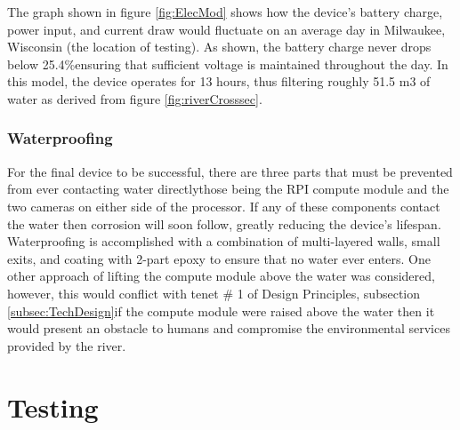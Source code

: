 \documentclass[fleqn,10pt]{SelfArx} %
\begin{document}
	The graph shown in figure \ref{fig:ElecMod} shows how the device’s battery charge, power input, and current draw would fluctuate on an average day in Milwaukee, Wisconsin (the location of testing). As shown, the battery charge never drops below 25.4\%\textemdash ensuring that sufficient voltage is maintained throughout the day. In this model, the device operates for 13 hours, thus filtering roughly 51.5 m3 of water as derived from figure \ref{fig:riverCrosssec}.  
	
	
	\subsubsection{Waterproofing}
	For the final device to be successful, there are three parts that must be prevented from ever contacting water directly\textemdash those being the RPI compute module and the two cameras on either side of the processor. If any of these components contact the water then corrosion will soon follow, greatly reducing the device’s lifespan. Waterproofing is accomplished with a combination of multi-layered walls, small exits, and coating with 2-part epoxy to ensure that no water ever enters. One other approach of lifting the compute module above the water was considered, however, this would conflict with tenet \# 1 of Design Principles, subsection \ref{subsec:TechDesign}\textemdash if the compute module were raised above the water then it would present an obstacle to humans and compromise the environmental services provided by the river. 
	
	\section{Testing}
\end{document}
